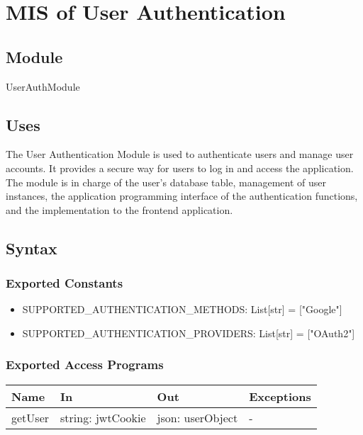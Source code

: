 \documentclass[12pt, titlepage]{article}
\begin{document}
\newpage


\section{MIS of User Authentication} \label{Module} 

\subsection{Module}

UserAuthModule

\subsection{Uses}

The User Authentication Module is used to authenticate users and manage user accounts. It provides a secure way for users to log in and access the application. The module is in charge of the user's database table, management of user instances, the application programming interface of the authentication functions, and the implementation to the frontend application.

\subsection{Syntax}

\subsubsection{Exported Constants}

\begin{itemize}
  \item SUPPORTED{\_}AUTHENTICATION{\_}METHODS: List[str] = ["Google"]
  \item SUPPORTED{\_}AUTHENTICATION{\_}PROVIDERS: List[str] = ["OAuth2"]
\end{itemize}

\subsubsection{Exported Access Programs}

\begin{center}
\begin{tabular}{p{2cm} p{4cm} p{5cm} p{3.5cm}}
\hline
\textbf{Name} & \textbf{In} & \textbf{Out} & \textbf{Exceptions} \\
\hline
getUser & string: jwtCookie & json: userObject & - \\
\hline
\end{tabular}
\end{center}
\end{document}
